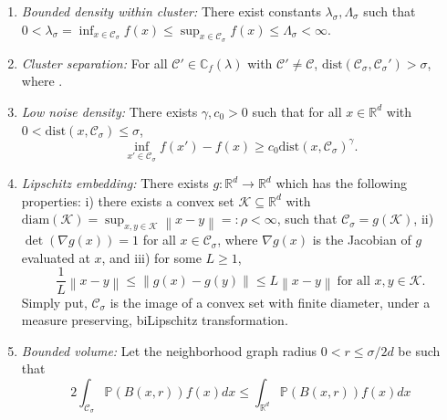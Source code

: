 \documentclass{article}
\newcommand{\diam}{\rho}
\newcommand{\Reals}{\mathbb{R}}
\newcommand{\Rd}{\Reals^d}
\newcommand{\norm}[1]{\left\lVert#1\right\rVert}
\newcommand{\1}{\mathbf{1}}
\newcommand{\dist}{\mathrm{dist}}
\newcommand{\Pbb}{\mathbb{P}}
\newcommand{\Cbb}{\mathbb{C}}
\newcommand{\Cset}{\mathcal{C}}
\newcommand{\Csig}{\Cset_{\sigma}}
\theoremstyle{aldenthm}
\theoremstyle{aldenrmrk}
\begin{document}
\begin{enumerate}[label=(A\arabic*)]
	\item
	\label{asmp: bounded_density}
	\emph{Bounded density within cluster:} There exist constants $\lambda_{\sigma}, \Lambda_{\sigma}$ such that $0 < \lambda_{\sigma} = \inf_{x \in \Csig} f(x) \leq \sup_{x \in \Csig} f(x) \leq \Lambda_{\sigma} < \infty$.
	
	\item
	\label{asmp: cluster_separation}
	\emph{Cluster separation:}
	For all $\Cset' \in \Cbb_f(\lambda)$ with $\Cset' \not= \Cset$, $\dist(\Csig,\Csig') > \sigma$,
	where \smash{$\dist(\Csig,\Csig') := \inf_{x \in \Csig} \dist(x,\Csig')$}. 
	
	\item 
	\label{asmp: low_noise_density}
	\emph{Low noise density:} There exists $\gamma,c_0 > 0$ such that for all $x
	\in \Rd$ with $0 < \dist(x, \Csig) \leq \sigma$,   
	$$
	\inf_{x' \in \Csig} f(x') - f(x) \geq  c_0 \dist(x, \Csig)^{\gamma}.
	$$ 
	
	\item
	\label{asmp: embedding}
	\emph{Lipschitz embedding:}
	There exists $g: \Reals^d \to \Reals^d$ which has the following properties: i) there exists a convex set $\mathcal{K} \subseteq \Rd$ with $\mathrm{diam}(\mathcal{K}) = \sup_{x,y \in \mathcal{K}}\norm{x - y} =: \diam < \infty$, such that $\Csig = g(\mathcal{K})$, ii) $\det(\nabla g (x)) = 1$ for all $x \in \Csig$, where $\nabla g(x)$ is the Jacobian of $g$ evaluated at $x$, and iii) for some $L \geq 1$, 
	\begin{equation*}
	\frac{1}{L}\norm{x - y} \leq \norm{g(x) - g(y)} \leq L \norm{x - y} ~ \text{for all $x,y \in \mathcal{K}$}.
	\end{equation*}
	Simply put, $\Csig$ is the image of a convex set with finite diameter, under a  measure preserving, biLipschitz transformation.
	\item
	\label{asmp: bounded_volume}
	\emph{Bounded volume:}
	Let the neighborhood graph radius $0 < r \leq \sigma/2d$ be such that
	\begin{equation*}
	2 \int_{\Csig} \Pbb(B(x,r)) f(x) dx \leq \int_{\Rd} \Pbb(B(x,r)) f(x) dx
	\end{equation*}
\end{enumerate}
\end{document}
